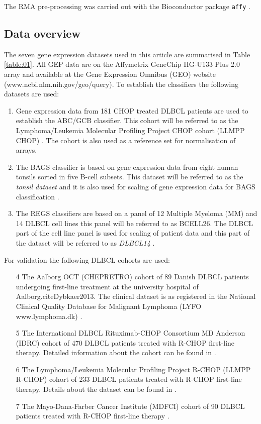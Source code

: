 \documentclass{article}
\begin{document}
The RMA pre-processing was carried out with the Bioconductor package \texttt{affy} \citep{Gautier2004}.

\subsection{Data overview}
The seven gene expression datasets used in this article are summarised in Table \ref{table:01}.
All GEP data are on the Affymetrix GeneChip HG-U133 Plus 2.0 array and available at the Gene Expression Omnibus (GEO) website (www.ncbi.nlm.nih.gov/geo/query).
To establish the classifiers the following datasets are used:
\begin{enumerate}
  \item Gene expression data from 181 CHOP treated DLBCL patients are used to establish the ABC/GCB classifier.
  This cohort will be referred to as the Lymphoma/Leukemia Molecular Profiling Project CHOP cohort (LLMPP CHOP) \citep{Lenz2008a}.
  The cohort is also used as a reference set for normalisation of arrays.
  \item The BAGS classifier is based on gene expression data from eight human tonsils sorted in five B-cell subsets.
  This dataset will be referred to as the \textit{tonsil dataset} and it is also used for scaling of gene expression data for BAGS classification \citep{Dybkaer2013}.
  \item The REGS classifiers are based on a panel of 12 Multiple Myeloma (MM) and 14 DLBCL cell lines this panel will be referred to as BCELL26.
  The DLBCL part of the cell line panel is used for scaling of patient data and this part of the dataset will be referred to as \textit{DLBCL14} \citep{Falgreen2013c}.
\end{enumerate}
For validation the following DLBCL cohorts are used:
\begin{enumerate}
  \item[4] The Aalborg OCT (CHEPRETRO) cohort of 89 Danish DLBCL patients undergoing first-line treatment at the university  hospital of Aalborg.cite{Dybkaer2013}.
  The clinical dataset is as registered in the National Clinical Quality Database for Malignant Lymphoma (LYFO www.lymphoma.dk) \citep{Gang2012}.
  \item[5] The International DLBCL Rituximab-CHOP Consortium MD Anderson (IDRC) cohort of 470 DLBCL patients treated with R-CHOP first-line therapy.
  Detailed information about the cohort can be found in \citep{Visco2012}.
  \item[6] The Lymphoma/Leukemia Molecular Profiling Project R-CHOP (LLMPP R-CHOP) cohort of 233 DLBCL patients treated with R-CHOP first-line therapy.
  Details about the dataset can be found in \citep{Lenz2008a}.
  \item[7] The Mayo-Dana-Farber Cancer Institute (MDFCI) cohort of 90 DLBCL patients treated with R-CHOP first-line therapy \citep{Monti2012a}.
\end{enumerate}
\end{document}

